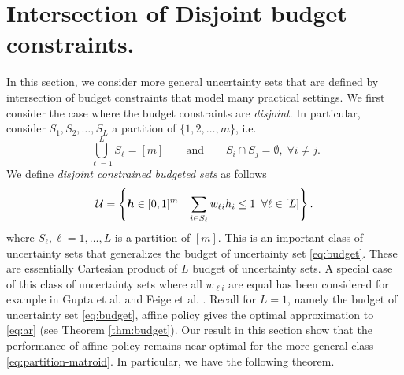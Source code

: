 \documentclass[moor]{informs1}              %
\newcommand{\mb}[1]{\ensuremath{\boldsymbol{#1}}}
\begin{document}
 

\section{Intersection of Disjoint budget constraints.}
In this section, we consider more general uncertainty sets that are defined by intersection of budget constraints that model many practical settings. We first consider the case where the budget constraints are {\em disjoint}. In particular, consider $S_1, S_2, \ldots, S_L$ a partition of $\{1,2,\ldots,m\}$, i.e. 
$$\bigcup_{{\ell}=1}^L S_{\ell} = [m] \qquad  \text{and} \qquad  S_i \cap S_j = \emptyset, \; \forall i \neq j.$$ We define  {\em disjoint constrained budgeted sets} as follows
\begin{equation}\label{eq:partition-matroid}
 {\cal U} = \left\{ \mb h \in [0,1]^m  \; \bigg\vert \;   \sum_{i \in S_{\ell}} w_{\ell i} h_i \leq 1  \;\;  \forall \ell \in [L] \right\}.
\end{equation}
where $S_{\ell}, \ell=1, \ldots,L$ is a partition of $[m]$.
This is an important class of uncertainty sets that generalizes the budget of uncertainty set \eqref{eq:budget}. These are essentially Cartesian product of $L$ budget of uncertainty sets. A special case of this class of uncertainty sets  where all $w_{\ell i}$ are equal has been considered for example in Gupta et al. \cite{gupta2016robust} and Feige et al. \cite{FJMM07}. Recall for $L=1$, namely the budget of uncertainty set \eqref{eq:budget}, affine policy gives the optimal approximation to \eqref{eq:ar} (see Theorem \ref{thm:budget}). Our result in this section show that the performance of affine policy remains near-optimal for the more general class \eqref{eq:partition-matroid}.  In particular, we have the following theorem. 
\end{document}
